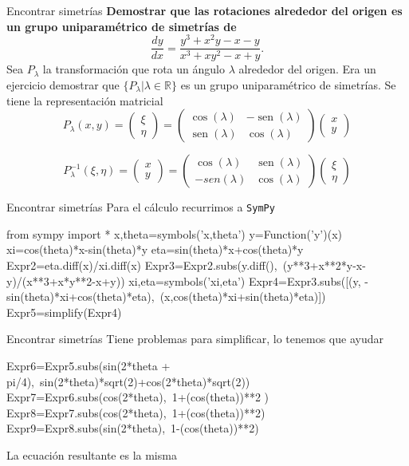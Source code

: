 \documentclass[handout,hyperref={colorlinks=true}]{beamer}
\newcommand{\rr}{\mathbb{R}}
\renewcommand{\emph}[1]{\textcolor[rgb]{1,0,0}{#1}}
\DeclareMathOperator{\sen}{sen}
\begin{document}
\begin{frame}{Encontrar simetrías}
\textbf{Demostrar que las rotaciones alrededor del origen es un grupo uniparamétrico de simetrías de}
 \[\frac{dy}{dx}=\frac{y^3+x^2y-x-y}{x^3+xy^2-x+y}.\]
Sea $P_{\lambda}$ la transformación que rota un ángulo $\lambda$ alrededor del origen. Era un ejercicio demostrar que  $\{P_{\lambda}|\lambda\in\rr\}$ es un grupo uniparamétrico de simetrías. Se tiene la representación matricial
\[
P_{\lambda}(x,y)= \begin{pmatrix} \xi\\ \eta
\end{pmatrix}=\begin{pmatrix} \cos(\lambda) & -\sen(\lambda)
\\ \sen(\lambda) & \cos(\lambda)
\end{pmatrix} \begin{pmatrix} x\\ y
\end{pmatrix}
\]

\[
P^{-1}_{\lambda}(\xi,\eta)= \begin{pmatrix} x\\ y
\end{pmatrix}=\begin{pmatrix} \cos(\lambda) & \sen(\lambda)
\\ -sen(\lambda) & \cos(\lambda)
\end{pmatrix} \begin{pmatrix} \xi\\ \eta
\end{pmatrix}
\]



\end{frame}


\begin{frame}[fragile]{Encontrar simetrías}
 Para el cálculo recurrimos a \texttt{SymPy}
\begin{sageblock}
from sympy import *
x,theta=symbols('x,theta')
y=Function('y')(x)
xi=cos(theta)*x-sin(theta)*y
eta=sin(theta)*x+cos(theta)*y
Expr2=eta.diff(x)/xi.diff(x)
Expr3=Expr2.subs(y.diff(),\
(y**3+x**2*y-x-y)/(x**3+x*y**2-x+y))
xi,eta=symbols('xi,eta')
Expr4=Expr3.subs([(y, -sin(theta)*xi+cos(theta)*eta),\
(x,cos(theta)*xi+sin(theta)*eta)])
Expr5=simplify(Expr4)
\end{sageblock}
\end{frame}

\begin{frame}[fragile]{Encontrar simetrías}
Tiene problemas para simplificar, lo tenemos que ayudar
\begin{sageblock}

Expr6=Expr5.subs(sin(2*theta + pi/4),\
sin(2*theta)*sqrt(2)+cos(2*theta)*sqrt(2))
Expr7=Expr6.subs(cos(2*theta),\
1+(cos(theta))**2   )
Expr8=Expr7.subs(cos(2*theta),\
1+(cos(theta))**2)
Expr9=Expr8.subs(sin(2*theta),\
1-(cos(theta))**2)
\end{sageblock}
La ecuación resultante es \emph{la misma}
\end{frame}
\end{document}
